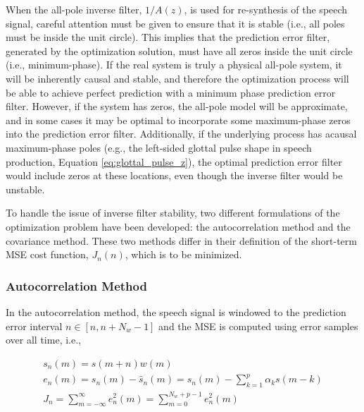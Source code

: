 When the all-pole inverse filter, $1/A(z)$,  is used for re-synthesis of the speech signal, careful attention must be given to ensure that it is stable (i.e., all poles must be inside the unit circle). This implies that the prediction error filter, generated by the optimization solution, must have all zeros inside the unit circle (i.e., minimum-phase). If the real system is truly a physical all-pole system, it will be inherently causal and stable, and therefore the optimization process will be able to achieve perfect prediction with a minimum phase prediction error filter. However, if the system has zeros, the all-pole model will be approximate, and in some cases it may be optimal to incorporate some maximum-phase zeros into the prediction error filter. Additionally, if the underlying process has acausal maximum-phase poles (e.g., the left-sided glottal pulse shape in speech production, Equation \ref{eq:glottal_pulse_z}), the optimal prediction error filter would include zeros at these locations, even though the inverse filter would be unstable.

To handle the issue of inverse filter stability, two different formulations of the optimization problem have been developed: the autocorrelation method and the covariance method. These two methods differ in their definition of the short-term MSE cost function, $J_n(n)$, which is to be minimized. 



\subsubsection{Autocorrelation Method} \label{lp_autocor}

In the autocorrelation method, the speech signal is windowed to the prediction error interval $n \in [n, n+N_w-1]$ and the MSE is computed using error samples over all time, i.e.,

\begin{eqnarray}
	s_n(m) = s(m+n)w(m) \\
	e_n(m) = s_n(m) - \hat{s}_n(m) = s_n(m) - \sum_{k=1}^{p} \alpha_k s(m-k) \\
	J_n = \sum_{m=-\infty}^{\infty}e_n^2(m) = \sum_{m=0}^{N_w+p-1}e_n^2(m) \label{eq:autocorr_tse}
\end{eqnarray}

